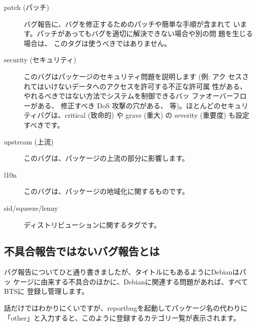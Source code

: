 \documentclass[mingoth,a4paper]{jsarticle}
\begin{document}
\begin{description}
 \item[patch (パッチ)]

            バグ報告に、バグを修正するためのパッチや簡単な手順が含まれて
            います。パッチがあってもバグを適切に解決できない場合や別の問
            題を生じる場合は、 このタグは使うべきではありません。

 \item[security (セキュリティ)]

            このバグはパッケージのセキュリティ問題を説明します (例: アク
            セスされてはいけないデータへのアクセスを許可する不正な許可属
            性がある、 やれるべきではない方法でシステムを制御できるバッ
            ファオーバーフローがある、 修正すべき DoS 攻撃の穴がある、
            等)。ほとんどのセキュリティバグは、critical (致命的) や
            grave (重大) の severity (重要度) も設定すべきです。

 \item[upstream (上流)]

            このバグは、パッケージの上流の部分に影響します。

 \item[l10n]

            このバグは、パッケージの地域化に関するものです。

 \item[sid/squeeze/lenny]

            ディストリビューションに関するタグです。
\end{description}


\subsection{不具合報告ではないバグ報告とは}

バグ報告についてひと通り書きましたが、タイトルにもあるようにDebianはパッ
ケージに由来する不具合のほかに、Debianに関連する問題があれば、すべてBTSに
登録し管理します。

話だけではわかりにくいですが、reportbugを起動してパッケージ名の代わりに
「other」と入力すると、このように登録するカテゴリ一覧が表示されます。
\end{document}
